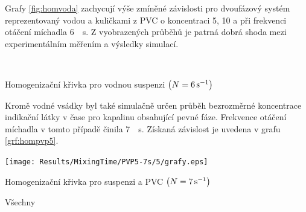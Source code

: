 Grafy \ref{fig:homvoda} zachycují výše zmíněné závislosti pro dvoufázový systém reprezentovaný vodou a kuličkami z PVC o koncentraci 5, 10 a  při frekvenci otáčení míchadla \SI{6}{\per\second}. Z vyobrazených průběhů je patrná dobrá shoda mezi experimentálním měřením a výsledky simulací.

\begin{grf}[h!]
 \centering
  \\ 
\end{grf}
\newpage

\begin{grf}[t!]
  \addtocounter{subgrf}{2}
  \centering
  \caption{Homogenizační křivka pro vodnou suspenzi $\left( N=\SI{6}{\per\second} \right)$}
  \label{fig:homvoda}
\end{grf}
\noindent Kromě vodné vsádky byl také simulačně určen průběh bezrozměrné koncentrace indikační látky v čase pro kapalinu \pvpP{} obsahující  pevné fáze. Frekvence otáčení míchadla v tomto případě činila \SI{7}{\per\second}. Získaná závislost je uvedena v grafu \ref{grf:hompvp5}.
\begin{grf}[h!]
 \centering 
  \texttt{[image: Results/MixingTime/PVP5-7s/5/grafy.eps]}
  \caption{Homogenizační křivka pro suspenzi \pvpP{} a  PVC $\left( N=\SI{7}{\per\second} \right)$}
  \label{grf:hompvp5}
\end{grf}
\newpage

Všechny


